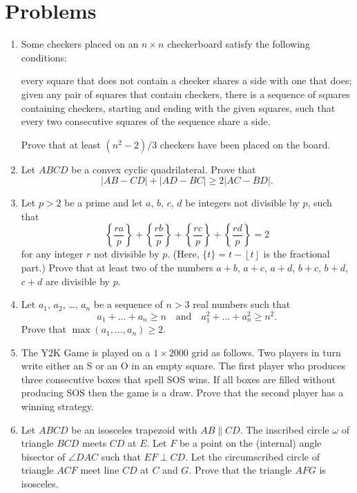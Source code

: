 \documentclass[11pt]{scrartcl}
\begin{document}
\section{Problems}
\begin{enumerate}[\bfseries 1.]
\item %
Some checkers placed on an $n \times n$ checkerboard satisfy the following conditions:
\begin{enumerate}
  \ii[(a)] every square that does not contain a checker shares a side with one that does;
  \ii[(b)] given any pair of squares that contain checkers,
  there is a sequence of squares containing checkers,
  starting and ending with the given squares,
  such that every two consecutive squares of the sequence share a side.
\end{enumerate}
Prove that at least $(n^{2}-2)/3$ checkers have been placed on the board.

\item %
Let $ABCD$ be a convex cyclic quadrilateral.
Prove that \[ |AB - CD| + |AD - BC| \geq 2|AC - BD|. \]

\item %
Let $p > 2$ be a prime and let $a$, $b$, $c$, $d$ be integers not divisible by $p$,
such that
\[ \left\{ \dfrac{ra}{p} \right\} + \left\{ \dfrac{rb}{p} \right\}
  + \left\{ \dfrac{rc}{p} \right\} + \left\{ \dfrac{rd}{p} \right\} = 2  \]
for any integer $r$ not divisible by $p$.
(Here, $\{t\} = t - \left\lfloor t \right\rfloor$ is the fractional part.)
Prove that at least two of the numbers
$a+b$, $a+c$, $a+d$, $b+c$, $b+d$, $c+d$ are divisible by $p$.

\item %
Let $a_1$, $a_2$, \dots, $a_n$ be a sequence of $n > 3$ real numbers
such that
\[ a_1 + \dots + a_n \ge n \quad\text{and}\quad
  a_1^2 + \dots + a_n^2 \ge n^2. \]
Prove that $\max(a_1, \dots, a_n) \ge 2$.

\item %
The Y2K Game is played on a $1 \times 2000$ grid as follows.
Two players in turn write either an S or an O in an empty square.
The first player who produces three consecutive boxes that spell SOS wins.
If all boxes are filled without producing SOS then the game is a draw.
Prove that the second player has a winning strategy.

\item %
Let $ABCD$ be an isosceles trapezoid with $AB \parallel CD$.
The inscribed circle $\omega$ of triangle $BCD$ meets $CD$ at $E$.
Let $F$ be a point on the (internal) angle bisector of $\angle DAC$
such that $EF \perp CD$.
Let the circumscribed circle of triangle $ACF$
meet line $CD$ at $C$ and $G$.
Prove that the triangle $AFG$ is isosceles.

\end{enumerate}
\pagebreak
\end{document}
